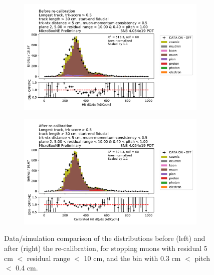 \begin{figure}[H] 
\begin{center}
    \begin{subfigure}[b]{0.45\textwidth}
    \centering
    \includegraphics[width=1.00\textwidth]{stopping_muons_protons/muons_500_residualrange_1000_040_pitch_100apres.pdf}
    \end{subfigure}
    \begin{subfigure}[b]{0.45\textwidth}
    \centering
    \includegraphics[width=1.00\textwidth]{stopping_muons_protons/muons_500_residualrange_1000_040_pitch_100depois.pdf}
    \end{subfigure}
\caption{Data/simulation comparison of the \dqdx distributions before (left) and after (right) the re-calibration, for stopping muons with residual 5 cm $<$ residual range $<$ 10 cm, and the bin with 0.3 cm $<$ pitch $<$ 0.4 cm.}
\label{fig:stopping_muons_small_rr_before_after}
\end{center}
\end{figure}

